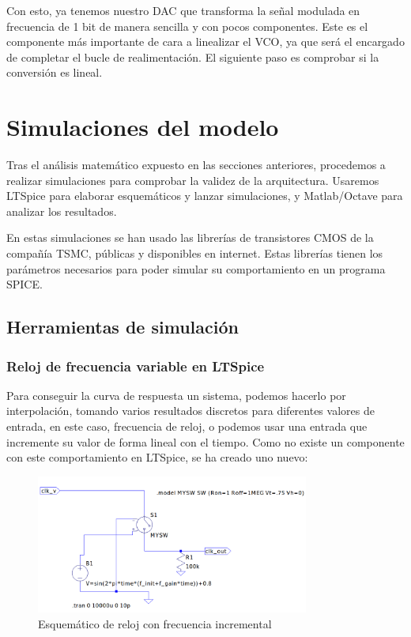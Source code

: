 \documentclass[12pt]{report} %
\begin{document}
	Con esto, ya tenemos nuestro DAC que transforma la señal modulada en frecuencia de 1 bit de manera sencilla y con pocos componentes. Este es el componente más importante de cara a linealizar el VCO, ya que será el encargado de completar el bucle de realimentación. El siguiente paso es comprobar si la conversión es lineal.
	
	\section{Simulaciones del modelo}
	
	Tras el análisis matemático expuesto en las secciones anteriores, procedemos a realizar simulaciones para comprobar la validez de la arquitectura. Usaremos LTSpice para elaborar esquemáticos y lanzar simulaciones, y Matlab/Octave para analizar los resultados.
	
	En estas simulaciones se han usado las librerías de transistores CMOS de la compañía TSMC, públicas y disponibles en internet. Estas librerías tienen los parámetros necesarios para poder simular su comportamiento en un programa SPICE.
	
	\subsection{Herramientas de simulación}
	
	\subsubsection{Reloj de frecuencia variable en LTSpice}
	Para conseguir la curva de respuesta un sistema, podemos hacerlo por interpolación, tomando varios resultados discretos para diferentes valores de entrada, en este caso, frecuencia de reloj, o podemos usar una entrada que incremente su valor de forma lineal con el tiempo. Como no existe un componente con este comportamiento en LTSpice, se ha creado uno nuevo:
	
	\begin{figure}[H]
		\includegraphics[width=0.8\textwidth]{ltspice-clk-freq.png}
		\caption[Esquemático de reloj con frecuencia incremental]{Esquemático de reloj con frecuencia incremental}
		\label{fig:ltspice-clk-freq.png}
	\end{figure}
	
\end{document}
